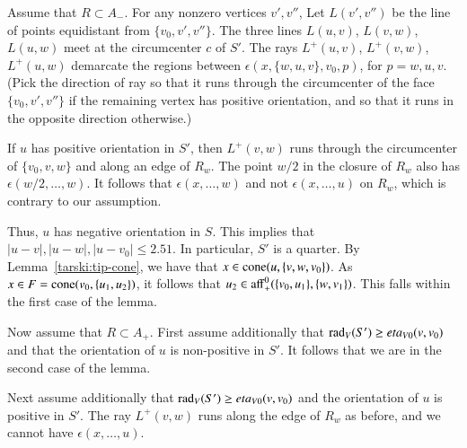 \begin{tarskidata}
\begin{tarski}
\begin{proved}
Assume that $R\subset A_-$.
For any nonzero vertices $v',v''$,
Let $L(v',v'')$ be the line of points equidistant from $\{v_0,v',v''\}$.
The three lines $L(u,v)$, $L(v,w)$, $L(u,w)$ meet at the circumcenter
$c$ of $S'$.  The rays $L^+(u,v)$, $L^+(v,w)$, $L^+(u,w)$ demarcate
the regions between $\epsilon(x,\{w,u,v\},v_0,p)$, for $p=w,u,v$.  
(Pick the direction
of ray so that it runs through the circumcenter of the face $\{v_0,v',v''\}$
if the remaining vertex has positive orientation, and so that it
runs in the opposite direction otherwise.)

If $u$ has positive orientation in $S'$, then $L^+(v,w)$ runs through
the circumcenter of $\{v_0,v,w\}$ and along an edge of $R_w$.
The point $w/2$ in the closure of  $R_w$ also has 
$\epsilon(w/2,\ldots,w)$.
It follows that $\epsilon(x,\ldots,w)$ and not $\epsilon(x,\ldots,u)$
on $R_w$, which is contrary
to our assumption.

Thus, $u$ has negative orientation in $S$.  
This implies that $|u-v|,|u-w|,|u-v_0|\le 2.51$.  In particular,
$S'$ is a quarter.  By Lemma~\ref{tarski:tip-cone}, we have
that $x\in {\operatorname{cone}}(u,\{v,w,v_0\})$.  As $x\in F = {\operatorname{cone}}(v_0,\{u_1,u_2\})$, it follows that $u_2\in {\operatorname{aff}}_+^0(\{v_0,u_1\},\{w,v_1\})$.
This falls within the first case of the lemma.


Now assume that $R\subset A_+$.
First assume additionally that
$\operatorname{rad}_V(S')\ge eta_{V0}(v,v_0)$ and that
the orientation of $u$ is non-positive in $S'$.  It
follows that we are in the second case of the lemma.  

Next assume additionally that
$\operatorname{rad}_V(S')\ge eta_{V0}(v,v_0)$ and the orientation of $u$ is positive
in $S'$.  The ray $L^+(v,w)$ runs along the edge of 
$R_w$ as before, and we cannot have $\epsilon(x,\ldots,u)$.


\end{proved}
\end{tarski}
\end{tarskidata}

